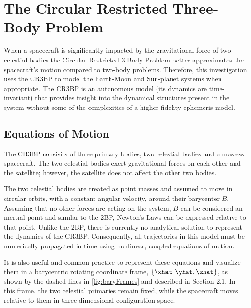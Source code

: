 \section{The Circular Restricted Three-Body Problem}
When a spacecraft is significantly impacted by the gravitational force of
two celestial bodies the Circular Restricted 3-Body Problem better approximates the spacecraft's
motion compared to two-body problems. Therefore, this investigation uses the CR3BP to model the
Earth-Moon and Sun-planet systems when appropriate. The CR3BP is an autonomous model (its dynamics
are time-invariant) that provides insight into the dynamical structures present in the system
without some of the complexities of a higher-fidelity ephemeris model.

\subsection{Equations of Motion}
The CR3BP consisits of three primary bodies, two celestial bodies and a masless spacecraft. The two
celestial bodies exert gravitational forces on each other and the satellite; however, the satellite
does not affect the other two bodies. 

The two celestial bodies are treated as point masses and assumed to move in circular orbits, with a
constant angular velocity, around their barycenter $B$. Assuming that no other forces are acting on
the system, $B$ can be considered an inertial point and similar to the 2BP, Newton's Laws can be
expressed relative to that point. Unlike the 2BP, there is currently no analytical solution to
represent the dynamics of the CR3BP. Consequently, all trajectories in this model must be
numerically propagated in time using nonlinear, coupled equations of motion.

It is also useful and common practice to represent these equations and visualize them in a
barycentric rotating coordinate frame, $\{\xhat,\yhat,\zhat\}$, as shown by the dashed lines in
\cref{fig:baryFrames} and described in Section 2.1. In this frame, the two celestial primaries
remain fixed, while the spacecraft moves relative to them in three-dimensional configuration space.


